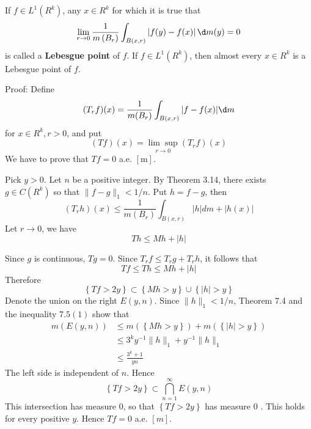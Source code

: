 \documentclass[12pt, a4paper, oneside]{book}
\begin{document}
\begin{theorem}
    If $f \in L^1\left(R^k\right)$, any $x \in R^k$ for which it is true that
    \begin{equation*}
        \lim _{r \rightarrow 0} \frac{1}{m\left(B_r\right)} \int_{B(x, r)}
        \left|f(y)-f(x) \right|\d  m(y)
        =
        0
    \end{equation*}
    is called a \textbf{Lebesgue point} of $f$.
    If $f \in L^1\left(R^k\right)$, then almost every $x \in R^k$ is a Lebesgue point of $f$.

    Proof: Define
    \begin{equation*}
        (T_r f)(x)=\frac{1}{m(B_r)} \int_{B(x, r)}|f-f(x)| \d  m
    \end{equation*}
    for $x \in R^k, r>0$, and put
    \begin{equation*}
        (T f)(x)=\underset{r \rightarrow 0}{\lim \sup} \left(T_r f\right)(x)
    \end{equation*}
    We have to prove that $Tf=0$ a.e. $[\mathrm{m}]$.

    Pick $y>0$. Let $n$ be a positive integer. By Theorem 3.14, there exists $g \in C\left(R^k\right)$ so that $\|f-g\|_1<1 / n$. Put $h=f-g$, then
    \begin{equation*}
        \left(T_r h\right)(x)
        \leq
        \frac{1}{m\left(B_r\right)} \int_{B(x, r)}|h| d m+|h(x)|
    \end{equation*}
    Let $ r \to 0 $, we have
    \begin{equation*}
        T h \leq M h+|h|
    \end{equation*}

    Since $g$ is continuous, $T g=0$. Since $T_{r} f \leq T_{r} g+T_{r} h$, it follows that
    \begin{equation*}
        T f \leq T h\leq M h+|h|
    \end{equation*}
    Therefore
    \begin{equation*}
        \left\{T f>2 y\right\} \subset\left\{M h>y\right\} \cup\left\{|h|>y\right\}
    \end{equation*}
    Denote the union on the right $E(y, n)$. Since $\|h\|_1<1 / n$, Theorem 7.4 and the inequality $7.5(1)$ show that
    \begin{equation*}
        \begin{aligned}
            m(E(y, n)) & \leq m(\left\{M h>y\right\}) + m(\left\{|h|>y\right\}) \\
                       & \leq 3^k y^{-1} \|h\|_1 + y^{-1} \|h\|_1               \\
                       & \leq \frac{ 3^k+1 }{ yn }
        \end{aligned}
    \end{equation*}
    The left side is independent of $n$. Hence
    \begin{equation*}
        \left\{T f>2 y\right\} \subset \bigcap_{n=1}^{\infty} E(y, n)
    \end{equation*}
    This intersection has measure 0, so that $\left\{T f>2 y\right\}$  has measure 0 . This holds for every positive $y$. Hence $T f=0$ a.e. $[m]$.
\end{theorem}
\end{document}
